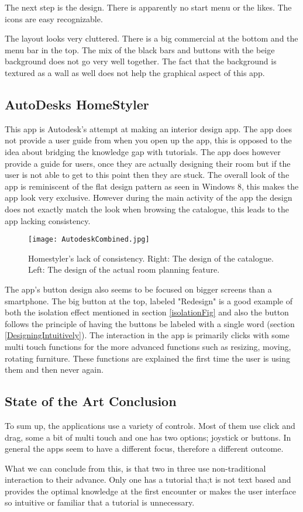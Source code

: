 The next step is the design. There is apparently no start menu or the likes. 
The icons are easy recognizable.  

The layout looks very cluttered. There is a big commercial at the bottom and the menu bar in the top. 
The mix of the black bars and buttons with the beige background does not go very well together. The fact that the background is textured as a wall as well does not help the graphical aspect of this app. 

\subsection{AutoDesks HomeStyler}
This app is Autodesk's attempt at making an interior design app. The app does not provide a user guide from when you open up the app, this is opposed to the idea about bridging the knowledge gap with tutorials. The app does however provide a guide for users, once they are actually designing their room but if the user is not able to get to this point then they are stuck. The overall look of the app is reminiscent of the flat design pattern as seen in Windows 8, this makes the app look very exclusive. However during the main activity of the app the design does not exactly match the look when browsing the catalogue, this leads to the app lacking consistency. 

\begin{figure}[H]
\centering
\texttt{[image: AutodeskCombined.jpg]}
\caption{Homestyler's lack of consistency. Right: The design of the catalogue. Left: The design of the actual room planning feature.}
\end{figure}

The app's button design also seems to be focused on bigger screens than a smartphone. The 
big button at the top, labeled "Redesign" is a good example of both the isolation effect mentioned in section \ref{isolationFig} and also the button follows the principle of having the buttons be labeled with a single word 
(section \ref{DesigningIntuitively}). The interaction in the app is primarily clicks with some multi touch functions for the more advanced functions such as resizing, moving, rotating furniture. These functions are explained the first time the user is using them and then never again.

\subsection{State of the Art Conclusion}

To sum up, the applications use a variety of controls. Most of them use click and drag, some a bit of multi touch and one has two options; joystick or buttons. 
In general the apps seem to have a different focus, therefore a different outcome.

What we can conclude from this, is that two in three use non-traditional interaction to their advance. Only one has a tutorial tha;t is not text based and provides the optimal knowledge at the first encounter or makes the user interface so intuitive or familiar that a tutorial is unnecessary.
